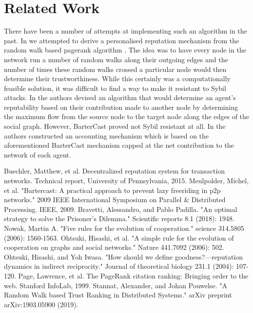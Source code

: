 \documentclass[11pt,a4paper]{article}
\theoremstyle{definition}
\theoremstyle{theorem}
\begin{document}
\noindent{}

\section{Related Work}
\label{sec:Related Work}
There have been a number of attempts at implementing such an algorithm in the past. In \cite{A Random Walk Based Trust Ranking in Distributed Systems} we attempted to derive a personalised reputation mechanism from the random walk based pagerank algorithm \cite{PageRank}. The idea was to have every node in the network run a number of random walks along their outgoing edges and the number of times these random walks crossed a particular node would then determine their trustworthiness. While this certainly was a computationally feasible solution, it was difficult to find a way to make it resistant to Sybil attacks. In \cite{BarterCast} the authors devised an algorithm that would determine an agent's reputability based on their contribution made to another node by determining the maximum flow from the source node to the target node along the edges of the social graph. However, BarterCast proved not Sybil resistant at all. In \cite{NetFlow} the authors constructed an accounting mechanism which is based on the aforementioned BarterCast mechanism capped at the net contribution to the network of each agent.  



\begin{thebibliography}{9}
Buechler, Matthew, et al. Decentralized reputation system for transaction networks. Technical report, University of Pennsylvania, 2015.
Meulpolder, Michel, et al. "Bartercast: A practical approach to prevent lazy freeriding in p2p networks." 2009 IEEE International Symposium on Parallel \& Distributed Processing. IEEE, 2009.
Bravetti, Alessandro, and Pablo Padilla. "An optimal strategy to solve the Prisoner’s Dilemma." Scientific reports 8.1 (2018): 1948.
Nowak, Martin A. "Five rules for the evolution of cooperation." science 314.5805 (2006): 1560-1563.
Ohtsuki, Hisashi, et al. "A simple rule for the evolution of cooperation on graphs and social networks." Nature 441.7092 (2006): 502.
Ohtsuki, Hisashi, and Yoh Iwasa. "How should we define goodness?—reputation dynamics in indirect reciprocity." Journal of theoretical biology 231.1 (2004): 107-120.
Page, Lawrence, et al. The PageRank citation ranking: Bringing order to the web. Stanford InfoLab, 1999. 
Stannat, Alexander, and Johan Pouwelse. "A Random Walk based Trust Ranking in Distributed Systems." arXiv preprint arXiv:1903.05900 (2019).
\end{thebibliography}
\end{document}

